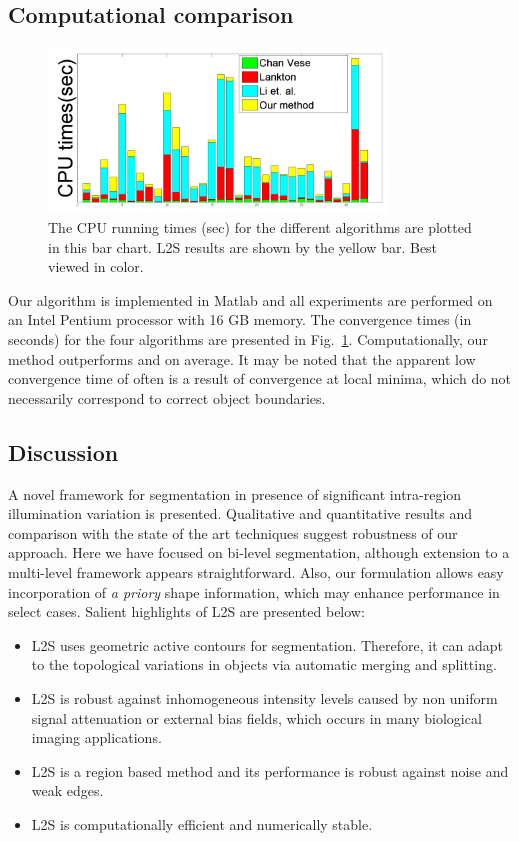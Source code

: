 \subsection{Computational comparison}
\begin{figure}[b]
\centering
\includegraphics[width=0.8\textwidth]{images/L2S_time}
\caption[Computational comparison for L2S]{The CPU running times (sec) for the different algorithms are plotted in this bar chart. L2S results are shown by the yellow bar. Best viewed in color.}	
\label{fig:L2S_comput}
\end{figure}
Our algorithm is implemented in Matlab and all experiments are performed on an Intel Pentium processor with 16 GB memory. The convergence times (in seconds) for the four algorithms are presented in Fig.~\ref{fig:L2S_comput}. Computationally, our method outperforms  \cite{lankton_localCV} and \cite{li_region_scalable} on average. It may be noted that the apparent low convergence time of \cite{chan_vese} often is a result of  convergence at local minima, which do not necessarily correspond to correct object boundaries.

\subsection{Discussion}
A novel framework for segmentation in presence of significant intra-region illumination variation is presented. Qualitative and quantitative results and comparison with the state of the art techniques suggest robustness of our approach. Here we have focused on bi-level segmentation, although extension to a multi-level framework appears straightforward. Also, our formulation allows easy incorporation of \textit{a priory} shape information, which may enhance performance in select cases. Salient highlights of L2S are presented below:
\begin{itemize}
\item L2S uses geometric active contours for segmentation. Therefore, it can adapt to the topological variations in objects via automatic merging and splitting.
\item L2S is robust against inhomogeneous intensity levels caused by non uniform signal attenuation or external bias fields, which occurs in many biological imaging applications. 
\item L2S is a region based method and its performance is robust against noise and weak edges.
\item L2S is computationally efficient and numerically stable.
\end{itemize}

